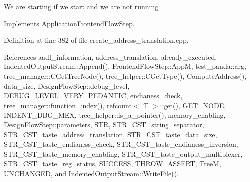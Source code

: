 We are starting if we start and we are not running 

Implements \hyperlink{classApplicationFrontendFlowStep_a2bf060a5ebc1735635dc5c7773387a25}{Application\+Frontend\+Flow\+Step}.



Definition at line 382 of file create\+\_\+address\+\_\+translation.\+cpp.



References aadl\+\_\+information, address\+\_\+translation, already\+\_\+executed, Indented\+Output\+Stream\+::\+Append(), Frontend\+Flow\+Step\+::\+AppM, test\+\_\+panda\+::arg, tree\+\_\+manager\+::\+C\+Get\+Tree\+Node(), tree\+\_\+helper\+::\+C\+Get\+Type(), Compute\+Address(), data\+\_\+size, Design\+Flow\+Step\+::debug\+\_\+level, D\+E\+B\+U\+G\+\_\+\+L\+E\+V\+E\+L\+\_\+\+V\+E\+R\+Y\+\_\+\+P\+E\+D\+A\+N\+T\+IC, endianess\+\_\+check, tree\+\_\+manager\+::function\+\_\+index(), refcount$<$ T $>$\+::get(), G\+E\+T\+\_\+\+N\+O\+DE, I\+N\+D\+E\+N\+T\+\_\+\+D\+B\+G\+\_\+\+M\+EX, tree\+\_\+helper\+::is\+\_\+a\+\_\+pointer(), memory\+\_\+enabling, Design\+Flow\+Step\+::parameters, S\+TR, S\+T\+R\+\_\+\+C\+S\+T\+\_\+string\+\_\+separator, S\+T\+R\+\_\+\+C\+S\+T\+\_\+taste\+\_\+address\+\_\+translation, S\+T\+R\+\_\+\+C\+S\+T\+\_\+taste\+\_\+data\+\_\+size, S\+T\+R\+\_\+\+C\+S\+T\+\_\+taste\+\_\+endianess\+\_\+check, S\+T\+R\+\_\+\+C\+S\+T\+\_\+taste\+\_\+endianess\+\_\+inversion, S\+T\+R\+\_\+\+C\+S\+T\+\_\+taste\+\_\+memory\+\_\+enabling, S\+T\+R\+\_\+\+C\+S\+T\+\_\+taste\+\_\+output\+\_\+multiplexer, S\+T\+R\+\_\+\+C\+S\+T\+\_\+taste\+\_\+reg\+\_\+status, S\+U\+C\+C\+E\+SS, T\+H\+R\+O\+W\+\_\+\+A\+S\+S\+E\+RT, TreeM, U\+N\+C\+H\+A\+N\+G\+ED, and Indented\+Output\+Stream\+::\+Write\+File().

